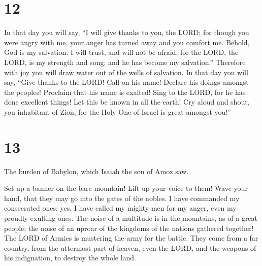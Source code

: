 \hypertarget{section-11}{%
\section{12}\label{section-11}}

 In that day you will say, ``I will give thanks to you,
the LORD; for though you were angry with me, your anger has turned away
and you comfort me.  Behold, God is my salvation. I will
trust, and will not be afraid; for the LORD, the LORD, is my strength
and song; and he has become my salvation.''  Therefore
with joy you will draw water out of the wells of salvation.
 In that day you will say, ``Give thanks to the LORD! Call
on his name! Declare his doings amongst the peoples! Proclaim that his
name is exalted!  Sing to the LORD, for he has done
excellent things! Let this be known in all the earth!  Cry
aloud and shout, you inhabitant of Zion, for the Holy One of Israel is
great amongst you!''

\hypertarget{section-12}{%
\section{13}\label{section-12}}

 The burden of Babylon, which Isaiah the son of Amoz saw.

 Set up a banner on the bare mountain! Lift up your voice
to them! Wave your hand, that they may go into the gates of the nobles.
 I have commanded my consecrated ones; yes, I have called
my mighty men for my anger, even my proudly exulting ones.
 The noise of a multitude is in the mountains, as of a
great people; the noise of an uproar of the kingdoms of the nations
gathered together! The LORD of Armies is mustering the army for the
battle.  They come from a far country, from the uttermost
part of heaven, even the LORD, and the weapons of his indignation, to
destroy the whole land.

